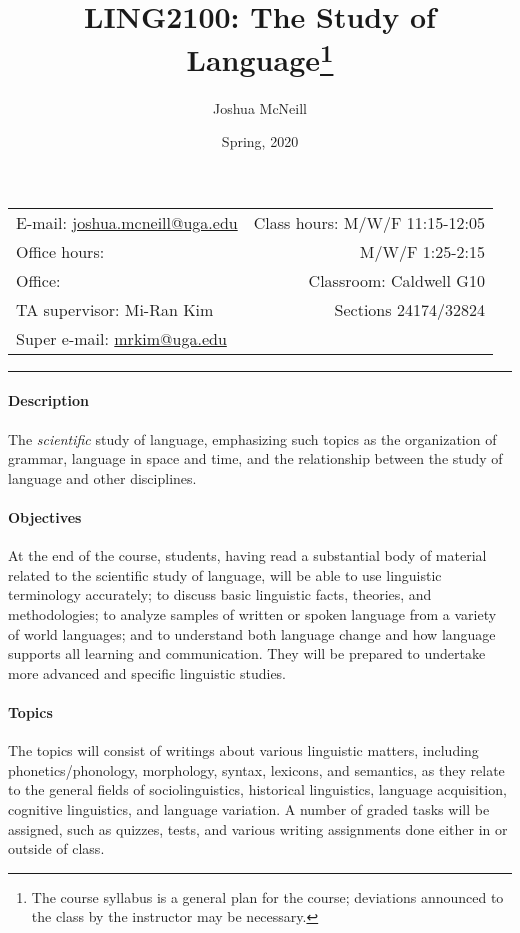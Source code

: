 \documentclass{article}
\title{LING2100: The Study of Language\footnote{The course syllabus is a general plan for the course; deviations announced to the class by the instructor may be necessary.}}
\author{Joshua McNeill}
\date{Spring, 2020}
\begin{document}
  \maketitle

  \begin{center}
    \begin{tabular}{@{} l r @{}}
      E-mail: \url{joshua.mcneill@uga.edu}              & Class hours: M/W/F 11:15-12:05\\
      Office hours:   & M/W/F 1:25-2:15\\
      Office:      & Classroom: Caldwell G10\\
      TA supervisor: Mi-Ran Kim                         & Sections 24174/32824\\
      Super e-mail: \url{mrkim@uga.edu}
    \end{tabular}
  \end{center}

  \hrule

  \paragraph{Description}
    The \emph{scientific} study of language, emphasizing such topics as the organization of grammar, language in space and time, and the relationship between the study of language and other disciplines.

  \paragraph{Objectives}
    At the end of the course, students, having read a substantial body of material related to the scientific study of language, will be able to use linguistic terminology accurately; to discuss basic linguistic facts, theories, and methodologies; to analyze samples of written or spoken language from a variety of world languages; and to understand both language change and how language supports all learning and communication. They will be prepared to undertake more advanced and specific linguistic studies.

  \paragraph{Topics}
    The topics will consist of writings about various linguistic matters, including phonetics/phonology, morphology, syntax, lexicons, and semantics, as they relate to the general fields of sociolinguistics, historical linguistics, language acquisition, cognitive linguistics, and language variation. A number of graded tasks will be assigned, such as quizzes, tests, and various writing assignments done either in or outside of class.
\end{document}
